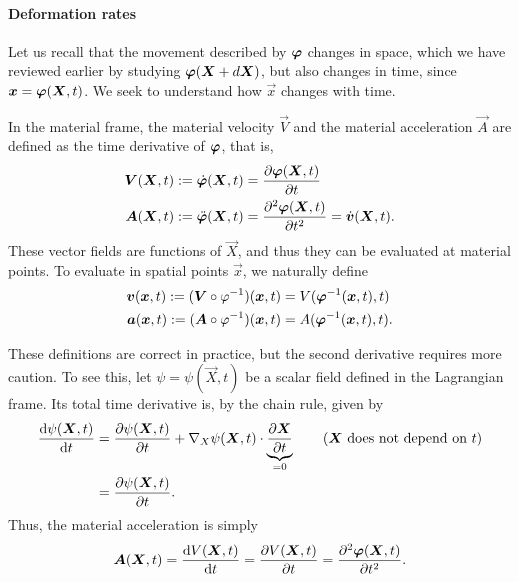 \paragraph{Deformation rates} Let us recall that the movement described by $\vvarphi$ changes in space, which we have reviewed earlier by studying $\vvarphi(\vec X + d\vec X)$, but also changes in time, since $\vec x =\vvarphi(\vec X, t)$. We seek to understand how $\vec x$ changes with time. 
\begin{definition}
    In the material frame, the material velocity $\vec V$ and the material acceleration $\vec A$ are defined as the time derivative of $\vvarphi$, that is, 
    \begin{align*}
        \vec V(\vec X, t) := \dot{\vvarphi}(\vec X, t) &= \frac{\partial \vvarphi(\vec X, t)}{\partial t}\\
        \vec A(\vec X, t) := \ddot{\vvarphi}(\vec X, t) &= \frac{\partial^2 \vvarphi(\vec X, t)}{\partial t^2} = \dot{\vec v}(\vec X, t).
    \end{align*}
    These vector fields are functions of $\vec X$, and thus they can be evaluated at material points. To evaluate in spatial points $\vec x$, we naturally define
    \begin{align*}
        \vec v(\vec x, t) := (\vec V \circ \varphi^{-1})(\vec x, t) &= V(\vvarphi^{-1}(\vec x, t), t)\\
        \vec a(\vec x, t) := (\vec A \circ \varphi^{-1})(\vec x, t) &= A(\vvarphi^{-1}(\vec x, t), t).
    \end{align*}
\end{definition}
These definitions are correct in practice, but the second derivative requires more caution. To see this, let $\psi=\psi(\vec X,t)$ be a scalar field defined in the Lagrangian frame. Its total time derivative is, by the chain rule, given by
\begin{align*}
    \frac{\mathrm{d}\psi(\vec X, t)}{\mathrm{d}t} &= \frac{\partial\psi(\vec X, t)}{\partial t } + \vX \psi(\vec X, t)\cdot \underbrace{\frac{\partial\vec X}{\partial t}}_{=0} \tag{$\vec X$ does not depend on $t$}\\
    &= \frac{\partial\psi(\vec X, t)}{\partial t }.
\end{align*}
Thus, the material acceleration is simply 
\begin{equation*}
    \vec A(\vec X, t) = \frac{\mathrm{d}V(\vec X, t)}{\mathrm{d}t} = \frac{\partial V(\vec X, t)}{\partial t} = \frac{\partial^2 \vvarphi(\vec X, t)}{\partial t^2}.
\end{equation*}
